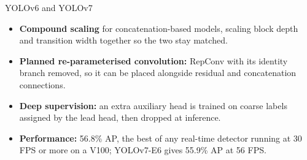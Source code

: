 \begin{frame}[allowframebreaks]{YOLOv6 and YOLOv7}
\begin{itemize}
        \item \textbf{Compound scaling} for concatenation-based models, scaling block depth and transition width together so the two stay matched.
        \item \textbf{Planned re-parameterised convolution:} RepConv with its identity branch removed, so it can be placed alongside residual and concatenation connections.
        \item \textbf{Deep supervision:} an extra auxiliary head is trained on coarse labels assigned by the lead head, then dropped at inference.
        \item \textbf{Performance:} 56.8\% AP, the best of any real-time detector running at 30 FPS or more on a V100; YOLOv7-E6 gives 55.9\% AP at 56 FPS.
    \end{itemize}
\end{frame}
